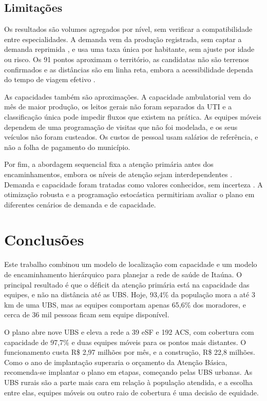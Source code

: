 \documentclass[12pt,a4paper,oneside]{report}
\begin{document}
\section{Limitações}
Os resultados são volumes agregados por nível, sem verificar a compatibilidade entre especialidades. A
demanda vem da produção registrada, sem captar a demanda reprimida \citep{santana2023}, e usa uma taxa
única por habitante, sem ajuste por idade ou risco. Os 91 pontos aproximam o território, as candidatas
não são terrenos confirmados e as distâncias são em linha reta, embora a acessibilidade dependa do tempo
de viagem efetivo \citep{aday1974}.

As capacidades também são aproximações. A capacidade ambulatorial vem do mês de maior produção, os
leitos gerais não foram separados da UTI e a classificação única pode impedir fluxos que existem na
prática. As equipes móveis dependem de uma programação de visitas que não foi modelada, e os seus veículos
não foram custeados. Os custos de pessoal usam salários de referência, e não a folha de pagamento do
município.

Por fim, a abordagem sequencial fixa a atenção primária antes dos encaminhamentos, embora os níveis de
atenção sejam interdependentes \citep{hodgson1988}. Demanda e capacidade foram tratadas como valores
conhecidos, sem incerteza \citep{snyder2006}. A otimização robusta e a programação estocástica
permitiriam avaliar o plano em diferentes cenários de demanda e de capacidade.

\chapter{Conclusões}
Este trabalho combinou um modelo de localização com capacidade e um modelo de encaminhamento hierárquico
para planejar a rede de saúde de Itaúna. O principal resultado é que o déficit da atenção primária está
na capacidade das equipes, e não na distância até as UBS. Hoje, 93,4\% da população mora a até 3 km de
uma UBS, mas as equipes comportam apenas 65,6\% dos moradores, e cerca de 36 mil pessoas ficam sem equipe
disponível.

O plano abre nove UBS e eleva a rede a 39 eSF e 192 ACS, com cobertura com capacidade de 97,7\% e duas
equipes móveis para os pontos mais distantes. O funcionamento custa R\$ 2,97 milhões por mês, e a
construção, R\$ 22,8 milhões. Como o ano de implantação superaria o orçamento da Atenção Básica,
recomenda-se implantar o plano em etapas, começando pelas UBS urbanas. As UBS rurais são a parte mais
cara em relação à população atendida, e a escolha entre elas, equipes móveis ou outro raio de cobertura é
uma decisão de equidade.
\end{document}

